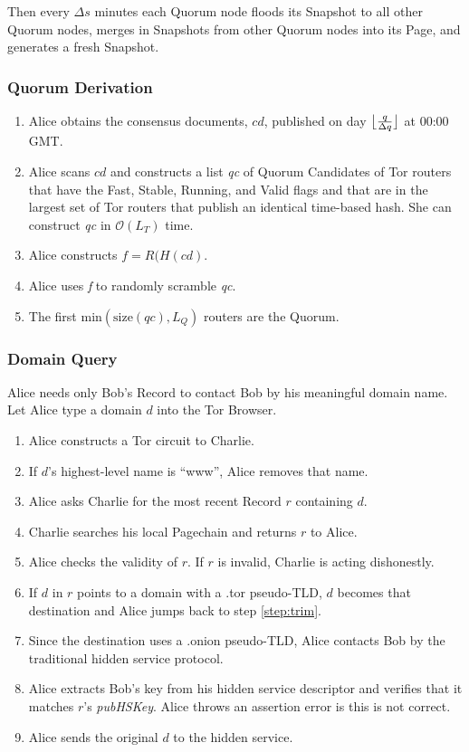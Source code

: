 \documentclass{sig-alternate}
\DeclarePairedDelimiter{\floor}{\lfloor}{\rfloor}
\begin{document}
Then every $ \Delta s $ minutes each Quorum node floods its Snapshot to all other Quorum nodes, merges in Snapshots from other Quorum nodes into its Page, and generates a fresh Snapshot.

\newpage

\subsubsection{Quorum Derivation} %

\begin{enumerate}
	\item Alice obtains the consensus documents, $ cd $, published on day $ \floor[\big]{\frac{q}{\Delta q}} $ at 00:00 GMT.
	\item Alice scans $ cd $ and constructs a list \emph{qc} of Quorum Candidates of Tor routers that have the Fast, Stable, Running, and Valid flags and that are in the largest set of Tor routers that publish an identical time-based hash. She can construct \emph{qc} in $ \mathcal{O}(L_{T}) $ time.
	\item Alice constructs $ f = \mathit{R}(H(\mathit{cd}) $.
	\item Alice uses \emph{f} to randomly scramble \emph{qc}.
	\item The first $ \mathrm{min}(\mathrm{size}(\mathit{qc}), L_{Q}) $ routers are the Quorum.
\end{enumerate}

\subsubsection{Domain Query} %

Alice needs only Bob's Record to contact Bob by his meaningful domain name. Let Alice type a domain $ d $ into the Tor Browser.

\begin{enumerate}[noitemsep]
	\item Alice constructs a Tor circuit to Charlie.
	\item \label{step:trim} If $ d $'s highest-level name is ``www'', Alice removes that name.
	\item \label{step:level} Alice asks Charlie for the most recent Record $ r $ containing $ d $.
	\item Charlie searches his local Pagechain and returns $ r $ to Alice.
	\item Alice checks the validity of $ r $. If $ r $ is invalid, Charlie is acting dishonestly.
	\item If $ d $ in $ r $ points to a domain with a .tor pseudo-TLD, $ d $ becomes that destination and Alice jumps back to step \ref{step:trim}.
	\item Since the destination uses a .onion pseudo-TLD, Alice contacts Bob by the traditional hidden service protocol.
	\item Alice extracts Bob's key from his hidden service descriptor and verifies that it matches $ r $'s \emph{pubHSKey}. Alice throws an assertion error is this is not correct.
	\item Alice sends the original $ d $ to the hidden service.
\end{enumerate}
\end{document}
